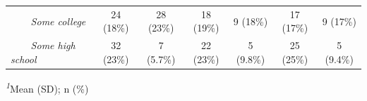 \begin{table}[t]
\begin{tabular*}{\linewidth}{@{\extracolsep{\fill}}lcccccc}
{\itshape     Some college} & 24 (18\%) & 28 (23\%) & 18 (19\%) & 9 (18\%) & 17 (17\%) & 9 (17\%) \\ 
{\itshape     Some high school} & 32 (23\%) & 7 (5.7\%) & 22 (23\%) & 5 (9.8\%) & 25 (25\%) & 5 (9.4\%) \\ 
\bottomrule
\end{tabular*}
\begin{minipage}{\linewidth}
\textsuperscript{\textit{1}}Mean (SD); n (\%)\\
\end{minipage}
\end{table}


